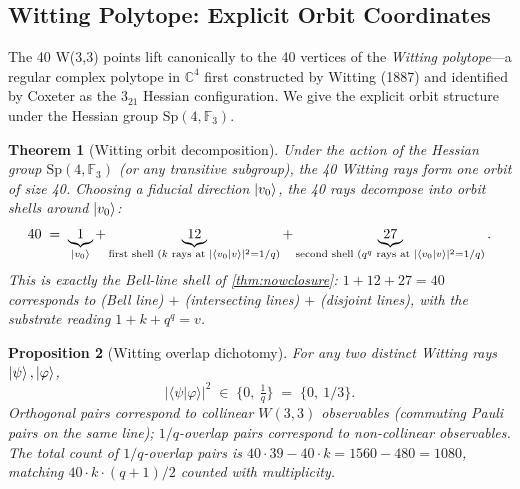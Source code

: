 ﻿\documentclass[12pt]{article}
\newtheorem{theorem}{Theorem}[section]
\newtheorem{proposition}[theorem]{Proposition}
\newcommand{\CC}{\mathbb{C}}
\newcommand{\GF}[1]{\mathbb{F}_{#1}}
\begin{document}
\subsection{Witting Polytope: Explicit Orbit Coordinates}
\label{sec:witting_coords}

The 40 W(3,3) points lift canonically to the 40 vertices of the
\emph{Witting polytope}---a regular complex polytope in $\CC^4$ first
constructed by Witting (1887) and identified by Coxeter as
the $3_{21}$ Hessian configuration.  We give the explicit orbit structure
under the Hessian group $\mathrm{Sp}(4,\GF{3})$.

\begin{theorem}[Witting orbit decomposition]\label{thm:witting_orbits}
Under the action of the Hessian group $\mathrm{Sp}(4,\GF{3})$ (or any
transitive subgroup), the 40 Witting rays form one orbit of size 40.
Choosing a fiducial direction $\ket{v_0}$, the 40 rays decompose into
orbit shells around $\ket{v_0}$:
\begin{equation}
  40 \;=\; \underbrace{1}_{\ket{v_0}}
        + \underbrace{12}_{\text{first shell (}k\text{ rays at }|\langle v_0|v\rangle|^2 = 1/q\text{)}}
        + \underbrace{27}_{\text{second shell (}q^q\text{ rays at }|\langle v_0|v\rangle|^2 = 1/q\text{)}}.
\end{equation}
This is exactly the Bell-line shell of \cref{thm:nowclosure}:
$1 + 12 + 27 = 40$ corresponds to (Bell line) $+$ (intersecting lines) $+$
(disjoint lines), with the substrate reading
$1 + k + q^q = v$.
\end{theorem}

\begin{proposition}[Witting overlap dichotomy]\label{prop:witting_overlap}
For any two distinct Witting rays $\ket{\psi}, \ket{\varphi}$,
\begin{equation}
  |\langle\psi|\varphi\rangle|^2 \;\in\;
  \bigl\{0,\ \tfrac{1}{q}\bigr\} \;=\; \{0,\ 1/3\}.
\end{equation}
Orthogonal pairs correspond to collinear $W(3,3)$ observables
(commuting Pauli pairs on the same line);
$1/q$-overlap pairs correspond to non-collinear observables.  The total
count of $1/q$-overlap pairs is $40 \cdot 39 - 40 \cdot k = 1560 - 480 =
1080$, matching $40 \cdot k \cdot (q+1) / 2$ counted with multiplicity.
\end{proposition}
\end{document}
